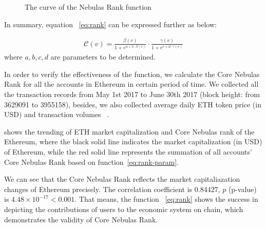 \begin{figure}
\centering
{}
\caption{The curve of the Nebulas Rank function \label{fig-nr}}
\end{figure}


\vspace{2em}
In summary, equation ~\ref{eq:rank} can be expressed further as below:

\begin{align}
\label{eq:rank-param}
\mathcal{C}(v) =  \frac{\beta(v)}{1+e^{a + b \cdot \beta(v)}} \cdot \frac{\gamma(v)}{1+e^{c + d \cdot \gamma(v)}}
\end{align}
\noindent where $a, b, c, d$ are parameters to be determined.


In order to verify the effectiveness of the function, we calculate the Core Nebulas Rank for all the accounts in Ethereum in certain period of time. We collected all the transaction records from May 1st 2017 to June 30th 2017 (block height: from 3629091 to 3955158), besides, we also collected average daily ETH token price (in USD) and transaction volumes ~\cite{coinmarketcap}.

 shows the trending of ETH market capitalization and Core Nebulas rank of the Ethereum, where the black solid line indicates the market capitalization (in USD) of Ethereum, while the red solid line represents the summation of all accounts' Core Nebulas Rank based on function~\ref{eq:rank-param}.

We can see that the Core Nebulas Rank reflects the market capitaliazation changes of Ethereum precisely. The correlation coefficient is 0.84427, $p$ (p-value) is $4.48\times{}10^{-17}<0.001$. That means, the function ~\ref{eq:rank} shows the success in depicting the contributions of users to the economic system on chain, which demonstrates the validity of Core Nebulas Rank. 


